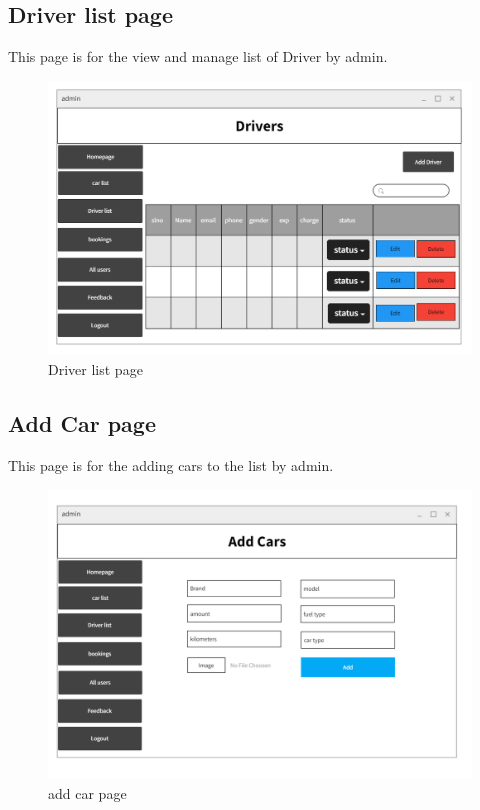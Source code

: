 \documentclass[a4paper,12pt,toc=flat]{report}
\begin{document}
	\pagebreak
	
	
		\subsection{Driver list page}
\hspace*{12pt}
	This page is for the view and manage list of Driver by admin.
	\begin{figure}[bph]
	\begin{center}
		\includegraphics[width=1.1 \linewidth, height=0.7\textheight]{"admin_driver.png"}
	\end{center}
		\caption{Driver list page}
	\end{figure}

	\pagebreak
        	
        	
\subsection{Add Car page}
\hspace*{12pt}
	This page is for the  adding cars to the list  by admin.
	\begin{figure}[bph]
	\begin{center}
		\includegraphics[width=1.1 \linewidth, height=0.7\textheight]{"add_cars.png"}
	\end{center}
		\caption{add car page}
	\end{figure}
\end{document}
